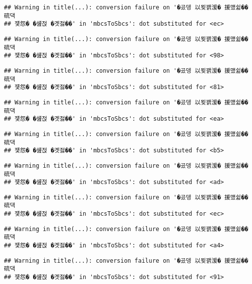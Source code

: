 \documentclass[
]{article}
\begin{document}
\begin{verbatim}
## Warning in title(...): conversion failure on '�곴뎅 以묒꽭湲� 援먰쉶�� 硫댁
## 쟻怨� �섎젅 �곗젏��' in 'mbcsToSbcs': dot substituted for <ec>
\end{verbatim}

\begin{verbatim}
## Warning in title(...): conversion failure on '�곴뎅 以묒꽭湲� 援먰쉶�� 硫댁
## 쟻怨� �섎젅 �곗젏��' in 'mbcsToSbcs': dot substituted for <98>
\end{verbatim}

\begin{verbatim}
## Warning in title(...): conversion failure on '�곴뎅 以묒꽭湲� 援먰쉶�� 硫댁
## 쟻怨� �섎젅 �곗젏��' in 'mbcsToSbcs': dot substituted for <81>
\end{verbatim}

\begin{verbatim}
## Warning in title(...): conversion failure on '�곴뎅 以묒꽭湲� 援먰쉶�� 硫댁
## 쟻怨� �섎젅 �곗젏��' in 'mbcsToSbcs': dot substituted for <ea>
\end{verbatim}

\begin{verbatim}
## Warning in title(...): conversion failure on '�곴뎅 以묒꽭湲� 援먰쉶�� 硫댁
## 쟻怨� �섎젅 �곗젏��' in 'mbcsToSbcs': dot substituted for <b5>
\end{verbatim}

\begin{verbatim}
## Warning in title(...): conversion failure on '�곴뎅 以묒꽭湲� 援먰쉶�� 硫댁
## 쟻怨� �섎젅 �곗젏��' in 'mbcsToSbcs': dot substituted for <ad>
\end{verbatim}

\begin{verbatim}
## Warning in title(...): conversion failure on '�곴뎅 以묒꽭湲� 援먰쉶�� 硫댁
## 쟻怨� �섎젅 �곗젏��' in 'mbcsToSbcs': dot substituted for <ec>
\end{verbatim}

\begin{verbatim}
## Warning in title(...): conversion failure on '�곴뎅 以묒꽭湲� 援먰쉶�� 硫댁
## 쟻怨� �섎젅 �곗젏��' in 'mbcsToSbcs': dot substituted for <a4>
\end{verbatim}

\begin{verbatim}
## Warning in title(...): conversion failure on '�곴뎅 以묒꽭湲� 援먰쉶�� 硫댁
## 쟻怨� �섎젅 �곗젏��' in 'mbcsToSbcs': dot substituted for <91>
\end{verbatim}
\end{document}
